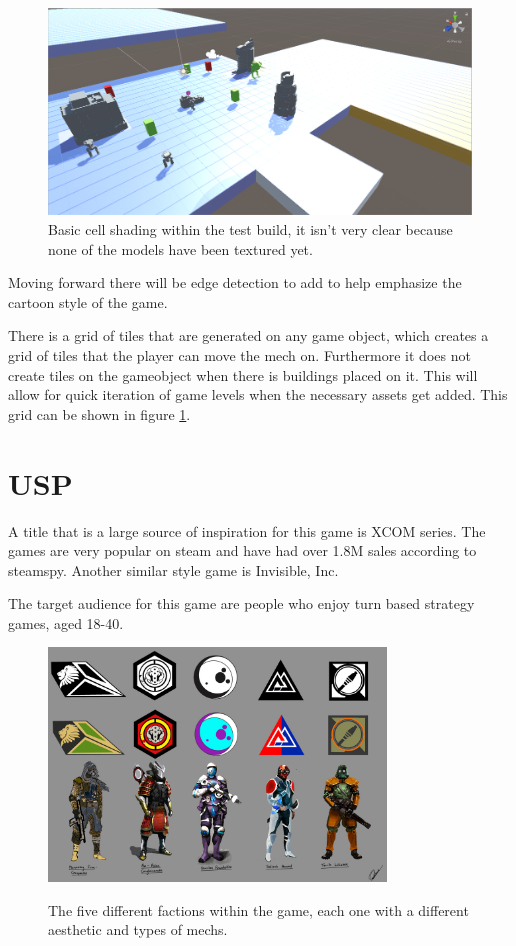 \documentclass{tufte-handout}
\begin{document}
\begin{figure}[h]
	\caption{Basic cell shading within the test build, it isn't very clear because none of the models have been textured yet.}
	\centering
	\label{testBuild}
	\includegraphics[width=1.0\textwidth]{TestBuild}
\end{figure}

Moving forward there will be edge detection to add to help emphasize the cartoon style of the game.

There is a grid of tiles that are generated on any game object, which creates a grid of tiles that the player can move the mech on. Furthermore it does not create tiles on the gameobject when there is buildings placed on it. This will allow for quick iteration of game levels when the necessary assets get added. This grid can be shown in figure \ref{testBuild}.

\section{USP}
A title that is a large source of inspiration for this  game is XCOM series. The games are very popular on steam and have had over 1.8M sales according to steamspy.
Another similar style game is Invisible, Inc.

The target audience for this game are people who enjoy turn based strategy games, aged 18-40.

\begin{figure}[h]
	\caption{The five different factions within the game, each one with a different aesthetic and types of mechs.}
	\centering
	\includegraphics[width=0.8\textwidth]{factions}
	\label{factions}
\end{figure}
\end{document}
